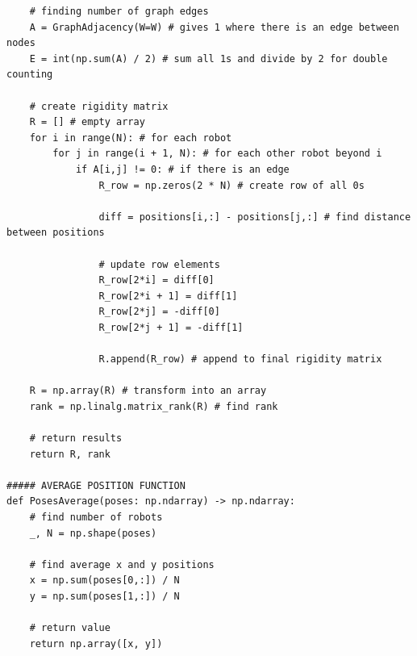 \documentclass[11pt]{article}
\begin{document}
\begin{verbatim}
    # finding number of graph edges
    A = GraphAdjacency(W=W) # gives 1 where there is an edge between nodes
    E = int(np.sum(A) / 2) # sum all 1s and divide by 2 for double counting

    # create rigidity matrix
    R = [] # empty array
    for i in range(N): # for each robot
        for j in range(i + 1, N): # for each other robot beyond i
            if A[i,j] != 0: # if there is an edge
                R_row = np.zeros(2 * N) # create row of all 0s

                diff = positions[i,:] - positions[j,:] # find distance between positions

                # update row elements
                R_row[2*i] = diff[0]
                R_row[2*i + 1] = diff[1]
                R_row[2*j] = -diff[0]
                R_row[2*j + 1] = -diff[1]

                R.append(R_row) # append to final rigidity matrix

    R = np.array(R) # transform into an array
    rank = np.linalg.matrix_rank(R) # find rank

    # return results
    return R, rank

##### AVERAGE POSITION FUNCTION
def PosesAverage(poses: np.ndarray) -> np.ndarray:
    # find number of robots
    _, N = np.shape(poses)

    # find average x and y positions
    x = np.sum(poses[0,:]) / N
    y = np.sum(poses[1,:]) / N

    # return value
    return np.array([x, y])
\end{verbatim}

\clearpage
\end{document}
